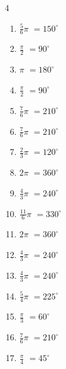 \begin{multicols}{4}
\begin{enumerate}
  \item $\displaystyle \frac{5}{6}\pi$
        $\displaystyle =150^{\circ}$

  \item $\displaystyle \frac{\pi}{2}$
        $\displaystyle =90^{\circ}$

  \item $\displaystyle \pi$
        $\displaystyle =180^{\circ}$

  \item $\displaystyle \frac{\pi}{2}$
        $\displaystyle =90^{\circ}$

  \item $\displaystyle \frac{7}{6}\pi$
        $\displaystyle =210^{\circ}$

  \item $\displaystyle \frac{7}{6}\pi$
        $\displaystyle =210^{\circ}$

  \item $\displaystyle \frac{2}{3}\pi$
        $\displaystyle =120^{\circ}$

  \item $\displaystyle 2\pi$
        $\displaystyle =360^{\circ}$

  \item $\displaystyle \frac{4}{3}\pi$
        $\displaystyle =240^{\circ}$

  \item $\displaystyle \frac{11}{6}\pi$
        $\displaystyle =330^{\circ}$

  \item $\displaystyle 2\pi$
        $\displaystyle =360^{\circ}$

  \item $\displaystyle \frac{4}{3}\pi$
        $\displaystyle =240^{\circ}$

\columnbreak %

  \item $\displaystyle \frac{4}{3}\pi$
        $\displaystyle =240^{\circ}$

  \item $\displaystyle \frac{5}{4}\pi$
        $\displaystyle =225^{\circ}$

  \item $\displaystyle \frac{\pi}{3}$
        $\displaystyle =60^{\circ}$

  \item $\displaystyle \frac{7}{6}\pi$
        $\displaystyle =210^{\circ}$

  \item $\displaystyle \frac{\pi}{4}$
        $\displaystyle =45^{\circ}$


\end{enumerate}
\end{multicols}
